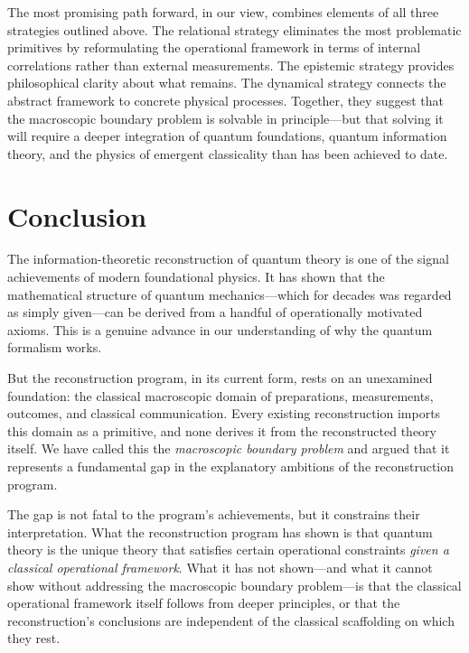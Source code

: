 \documentclass[pdflatex,sn-mathphys-num]{sn-jnl}%
\begin{document}
The most promising path forward, in our view, combines elements of all three strategies outlined above. The relational strategy eliminates the most problematic primitives by reformulating the operational framework in terms of internal correlations rather than external measurements. The epistemic strategy provides philosophical clarity about what remains. The dynamical strategy connects the abstract framework to concrete physical processes. Together, they suggest that the macroscopic boundary problem is solvable in principle---but that solving it will require a deeper integration of quantum foundations, quantum information theory, and the physics of emergent classicality than has been achieved to date.

\section{Conclusion}\label{sec6}

The information-theoretic reconstruction of quantum theory is one of the signal achievements of modern foundational physics. It has shown that the mathematical structure of quantum mechanics---which for decades was regarded as simply given---can be derived from a handful of operationally motivated axioms. This is a genuine advance in our understanding of why the quantum formalism works.

But the reconstruction program, in its current form, rests on an unexamined foundation: the classical macroscopic domain of preparations, measurements, outcomes, and classical communication. Every existing reconstruction imports this domain as a primitive, and none derives it from the reconstructed theory itself. We have called this the \emph{macroscopic boundary problem} and argued that it represents a fundamental gap in the explanatory ambitions of the reconstruction program.

The gap is not fatal to the program's achievements, but it constrains their interpretation. What the reconstruction program has shown is that quantum theory is the unique theory that satisfies certain operational constraints \emph{given a classical operational framework}. What it has not shown---and what it cannot show without addressing the macroscopic boundary problem---is that the classical operational framework itself follows from deeper principles, or that the reconstruction's conclusions are independent of the classical scaffolding on which they rest.
\end{document}
